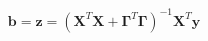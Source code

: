 \documentclass[10pt]{article}
\begin{document}
\begin{align*}\boldsymbol b = \boldsymbol z = \left( \boldsymbol X^T \boldsymbol X + \boldsymbol \Gamma^T \boldsymbol \Gamma \right)^{-1}
\boldsymbol X^T \boldsymbol y\end{align*}
\end{document}
